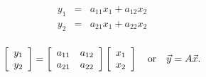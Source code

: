 \documentclass{ximera}
\begin{document}
\begin{eqnarray*}
y_1 &=& a_{11} x_1 + a_{12} x_2\\
y_2 &=& a_{21} x_1 + a_{22} x_2\\
\end{eqnarray*}

$$\left[{\begin{array}{c} y_1 \\ y_2 \\ \end{array}}\right] = \left[{\begin{array}{cc} a_{11} & a_{12} \\ a_{21} & a_{22} \\ \end{array}}\right] \left[{\begin{array}{c} x_1 \\ x_2 \\ \end{array}}\right]
\quad {\rm or} \quad \vec y = A \vec x.$$
\end{document}
